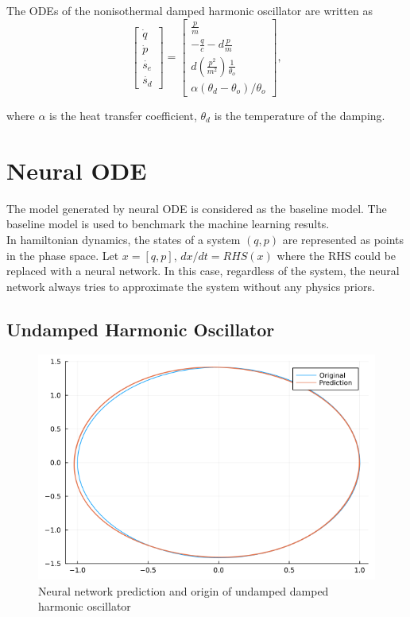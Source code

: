 The ODEs of the nonisothermal damped harmonic oscillator are written as
\begin{equation}
    \label{eq:ODE_nonisothermal_damped_harmonic_oscillator}
    \begin{bmatrix}
    \dot{q}\\
    \dot{p}\\
    \dot{s_{e}}\\
    \dot{s_{d}}
    \end{bmatrix}
    =
    \begin{bmatrix}
    \frac{p}{m}\\
    -\frac{q}{c}-d\frac{p}{m}\\
    d(\frac{p^2}{m^2})\frac{1}{\theta_{o}}\\
    \alpha(\theta_{d}-\theta_{o})/\theta_{o}
    \end{bmatrix},
\end{equation}

where $\alpha$ is the heat transfer coefficient, $\theta_{d}$ is the temperature of the damping.


\clearpage
\section{Neural ODE}
The model generated by neural ODE is considered as the baseline model. The baseline model is used to benchmark the machine learning results. \\
In hamiltonian dynamics, the states of a system $(q,p)$ are represented as points in the phase space. Let $x=[q,p]$, $dx/dt = RHS(x)$ where the RHS could be replaced with a neural network. In this case, regardless of the system, the neural network always tries to approximate the system without any physics priors.


\subsection{Undamped Harmonic Oscillator}

\begin{figure}[h!]
    \centering
    \includegraphics[scale=0.5]{figures/2_Neural_ODE/1_uho_ODE_result.png}
    \caption{Neural network prediction and origin of undamped damped harmonic oscillator}
    \label{fig:NN_ODE_udho}
\end{figure}


